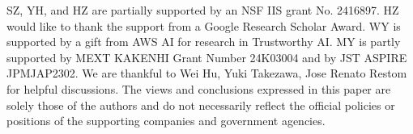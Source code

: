 SZ, YH, and HZ are partially supported by an NSF IIS grant No. 2416897. HZ would like to thank the support from a Google Research Scholar Award. WY is supported by a gift from AWS AI for research in Trustworthy AI. MY is partly supported by MEXT KAKENHI Grant Number 24K03004 and by JST ASPIRE JPMJAP2302. We are thankful to Wei Hu, Yuki Takezawa, Jose Renato Restom for helpful discussions. The views and conclusions expressed in this paper are solely those of the authors and do not necessarily reflect the official policies or positions of the supporting companies and
government agencies.
